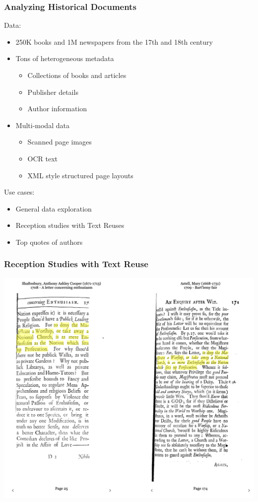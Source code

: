 \documentclass[pdf]{beamer}
\begin{document}
\begin{frame}
    \frametitle{Analyzing Historical Documents}
    Data:
    \begin{itemize}
        \item 250K books and 1M newspapers from the 17th and 18th century
        \item Tons of heterogeneous metadata
        \begin{itemize}
            \item Collections of books and articles
            \item Publisher details
            \item Author information
        \end{itemize}
        \item Multi-modal data  
        \begin{itemize}
            \item Scanned page images
            \item OCR text
            \item XML style structured page layouts
        \end{itemize}
    \end{itemize}
    Use cases:
    \begin{itemize}
        \item General data exploration
        \item Reception studies with Text Reuses   
        \item Top quotes of authors
    \end{itemize}
\end{frame}

\begin{frame}
    \frametitle{Reception Studies with Text Reuse}
    \includegraphics[width=\textwidth]{figs/Reception-Reader-Example.png}


\end{frame}
\end{document}
